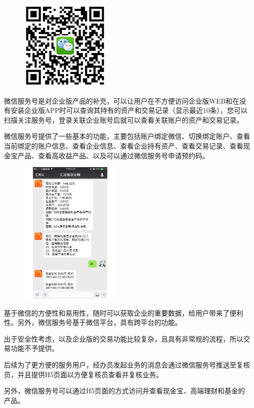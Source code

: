 \begin{figure}
	\includegraphics[scale=0.7]{picture/scanWechat.jpg}
	\label{fig:scanWechat}
\end{figure}
微信服务号是对企业版产品的补充，可以让用户在不方便访问企业版WEB和在没有安装企业版APP时可以查询其持有的资产和交易记录（显示最近10条），您可以扫描\hyperref[fig:scanWechat]{}关注服务号，登录关联企业账号后就可以查看关联账户的资产和交易记录。\par

微信服务号提供了一些基本的功能，主要包括账户绑定微信、切换绑定账户、查看当前绑定的账户信息、查看企业信息、查看企业持有资产、查看交易记录、查看现金宝产品、查看高收益产品、以及可以通过微信服务号申请预约码。\par

\begin{figure}
	\includegraphics[width=0.45\textwidth]{picture/weixin.pdf}
	\label{fig:weixin}
\end{figure}

基于微信的方便性和易用性，随时可以获取企业的重要数据，给用户带来了便利性。另外，微信服务号基于微信平台，具有跨平台的功能。\par

出于安全性考虑，以及企业版的交易功能比较复杂，且具有非常规的流程，所以交易功能不予提供。\par

后续为了更方便的服务用户，经办员发起业务的消息会通过微信服务号推送至复核员，并且提供H5页面以方便复核员查看并复核业务。\par

另外，微信服务号可以通过H5页面的方式访问并查看现金宝、高端理财和基金的产品。


